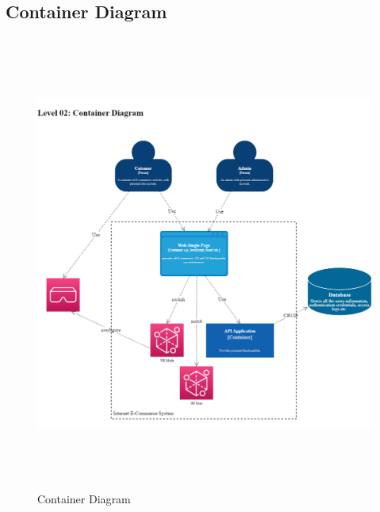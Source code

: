 \subsection{Container Diagram}
\begin{figure}[H]
    \centering
    \includegraphics[width=15cm,height=15cm]{Figures/Diagrams/ArchitecturalDiagram/ContainerDiagram.png}
    \caption{Container Diagram}
    \label{Container Diagram}
\end{figure}
